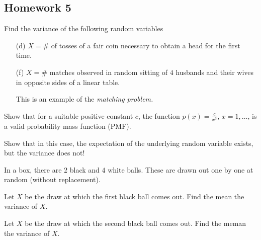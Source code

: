 \subsection{Homework 5}
\begin{problem}[Handout 7, \# 6(d, f)]
  Find the variance of the following random variables
  \begin{itemize}[noitemsep]
  \item[(d)] \(X=\#\) of tosses of a fair coin necessary to obtain a head
    for the first time.
  \item[(f)] \(X=\#\) matches observed in random sitting of \(4\) husbands
    and their wives in opposite sides of a linear table.

    This is an example of the \emph{matching problem.}
  \end{itemize}
\end{problem}
\begin{solution*}
\end{solution*}

\begin{problem}
  \begin{alphlist}
  \item Show that for a suitable positive constant \(c\), the function
    \(p(x)=\frac{c}{x^3}\), \(x=1,\dots\), is a valid probability mass
    function (PMF).
  \item Show that in this case, the expectation of the underlying random
    variable exists, but the variance does not!
  \end{alphlist}
\end{problem}
\begin{solution*}
\end{solution*}

\begin{problem}[Handout 7, \# 9]
  In a box, there are \(2\) black and \(4\) white balls. These are drawn
  out one by one at random (without replacement).
  \begin{alphlist}
  \item Let \(X\) be the draw at which the first black ball comes out. Find
    the mean the variance of \(X\).
  \item Let \(X\) be the draw at which the second black ball comes
    out. Find the meman the variance of \(X\).
  \end{alphlist}
\end{problem}
\begin{solution*}
\end{solution*}

